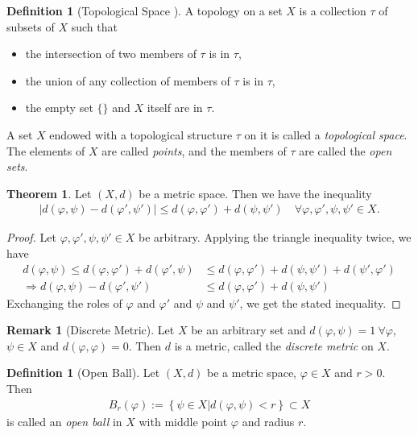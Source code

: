 \documentclass[12pt, a4paper]{article}
\numberwithin{equation}{section}
\theoremstyle{definition}
\theoremstyle{definition}
\newtheorem{defn}[thm]{Definition} %
\newtheorem{remark}[thm]{Remark} %
\newtheorem{theorem}[thm]{Theorem}
\newcommand{\abs}[1]{\left\vert #1 \right\vert}
\begin{document}
	\begin{defn}[Topological Space \cite{topology-singh}]
		A topology on a set $X$ is a collection $\tau$ of subsets of $X$ such that 
		\begin{itemize}
			\item the intersection of two members of $\tau$ is in $\tau$, 
			\item the union of any collection of members of $\tau$ is in $\tau$, 
			\item the empty set $\{\}$ and $X$ itself are in $\tau$.
		\end{itemize}
		A set $X$ endowed with a topological structure $\tau$ on it is called a \textit{topological space}. The elements of $X$ are called \textit{points}, and the members of $\tau$ are called the \textit{open sets}. 
	\end{defn} 
	
	\begin{theorem}\label{thrm:vierecksungleichung}
		Let $(X, d)$ be a metric space. Then we have the inequality
		\begin{align}
			\abs{d(\varphi, \psi) - d(\varphi', \psi')} \leq d(\varphi, \varphi') + d(\psi, \psi') \quad \forall \varphi, \varphi', \psi, \psi'\in X.
		\end{align}
	\end{theorem}

	\begin{proof}
		Let $\varphi, \varphi', \psi, \psi'\in X$ be arbitrary. Applying the triangle inequality twice, we have
		\begin{align}
			d(\varphi, \psi) \leq d(\varphi, \varphi') + d(\varphi', \psi) &\leq d(\varphi, \varphi') + d(\psi, \psi') + d(\psi', \varphi')
			\\ \Rightarrow d(\varphi, \psi) - d(\varphi', \psi') &\leq d(\varphi, \varphi') + d(\psi, \psi')
		\end{align}
		Exchanging the roles of $\varphi$ and $\varphi'$ and $\psi$ and $\psi'$, we get the stated inequality.
	\end{proof}
	
	\begin{remark}[Discrete Metric]\label{remark:discrete-metric}
		Let $X$ be an arbitrary set and $d(\varphi, \psi) = 1 \ \forall \varphi$, $\psi\in X$ and $d(\varphi, \varphi) = 0$. Then $d$ is a metric, called the \textit{discrete metric} on $X$. 
	\end{remark}
	
	\begin{defn}[Open Ball]
		Let $(X, d)$ be a metric space, $\varphi\in X$ and $r > 0$. Then 
		\begin{align}
			B_{r}(\varphi) := \left\{ \psi\in X \vert d(\varphi, \psi) < r\right\} \subset X
		\end{align}
		is called an \textit{open ball} in $X$ with middle point $\varphi$ and radius $r$. 
 	\end{defn}
 
\end{document}
